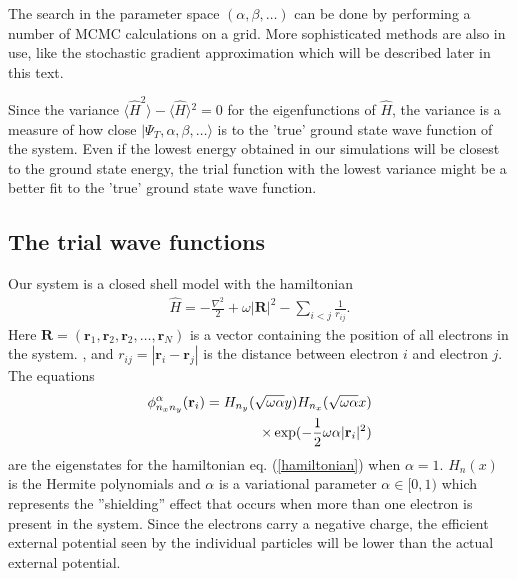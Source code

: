 \documentclass[a4paper,10pt,twocolumn]{article} %
\newcommand{\ts}[1]{\textbf{#1}}
\newcommand{\ket}[1]{|#1\rangle{}}
\newcommand{\expec}[1]{\langle{}{#1}\rangle{}}
\begin{document}
The search in the parameter space $(\alpha,\beta, \dots)$ can be done by performing a number of MCMC calculations on a grid. 
More sophisticated methods are also in use, like the stochastic gradient approximation which will be described later in this text.

Since the variance $\expec{\hat H^2}-\expec{\hat H}^2=0$ for the eigenfunctions of $\hat H$, the variance is a measure of how close 
$\ket{\Psi_T,\alpha,\beta,\dots}$ is to the 'true' ground state wave function of the system. Even if the lowest energy obtained in our simulations will be closest 
to the ground state energy, the trial function with the lowest variance might be a better fit to the 'true' ground state wave function. 

\subsection{The trial wave functions}%

Our system is a closed shell model with the hamiltonian 
\begin{align} 
	\hat H = -\frac{\nabla ^2}2 + \omega |\ts R|^2 - \sum_{i<j}\frac1{r_{ij}}.\label{hamiltonian}
\end{align}
Here $\ts R=(\ts r_1,\ts r_2, \ts r_2, \dots, \ts r_N)$ is a vector containing the position of all electrons in the system.
, and $r_{ij}=|\ts r_i-\ts r_j|$ is the distance between electron $i$ and electron $j$.
The equations
\begin{align}
	\phi_{n_xn_y}^\alpha(\ts r_i) = H_{n_y}(\sqrt{\omega\alpha}y)H_{n_x}(\sqrt{\omega\alpha}x)\notag\\
	\times \exp(-\frac12\omega\alpha|\ts r_i|^2) \label{1pts}
\end{align}
are the eigenstates for the hamiltonian eq. (\ref{hamiltonian}) when $\alpha=1$. $H_n(x)$ is the Hermite polynomials and $\alpha$ is a variational 
parameter $\alpha\in[0,1)$ which represents the ''shielding'' effect that occurs when more than one electron is present in the system. Since the 
electrons carry a negative charge, the efficient external potential seen by the individual particles will be lower than the actual external potential.
\end{document}
